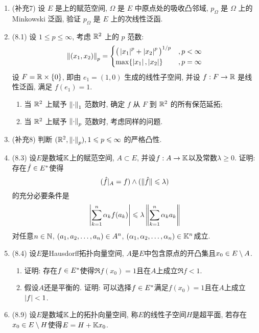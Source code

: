 	\begin{enumerate}[label=\textbf{\arabic*.}, ref=\arabic*]
		\item (补充7) 设 $ E $ 是\R 上的赋范空间, $ \varOmega $ 是 $ E $ 中原点处的吸收凸邻域, $ p_{\varOmega} $ 是 $ \varOmega $ 上的 Minkowski 泛函, 验证 $ p_{\varOmega} $ 是 $ E $ 上的次线性泛函.
		\item (8.1) 设 $ 1\leqslant p\leqslant\infty $, 考虑 $ \mathbb{R}^{2} $ 上的 $ p $ 范数:
			\[
				\left\| (x_{1}, x_{2}) \right\|_{p}=
				\begin{cases}
					\big( \left| x_{1} \right| ^{p}+\left| x_{2} \right| ^{p} \big)^{1/p} & ,p<\infty\\
					\max\{\left| x_{1} \right| , \left| x_{2} \right| \} & ,p = \infty
				\end{cases}
			\]
			设 $ F=\mathbb{R}\times\{ 0 \} $, 即由 $ e_{1}=(1, 0) $ 生成的线性子空间, 并设 $ f:F\to\mathbb{R} $ 是线性泛函, 满足 $ f(e_{1})=1 $.
			\begin{enumerate}[(1)]
				\item 当 $ \mathbb{R}^{2} $ 上赋予 $ \left\| \cdot \right\|_{1} $ 范数时, 确定 $ f $ 从 $ F $ 到 $ \mathbb{R}^{2} $ 的所有保范延拓;
				\item 当 $ \mathbb{R}^{2} $ 上赋予 $ \left\| \cdot \right\|_{p} $ 范数时, 考虑同样的问题.
			\end{enumerate}
		\item (补充8) 判断 $ (\mathbb{R}^{2}, \left\| \cdot \right\|_{p}), 1\leqslant p\leqslant\infty $ 的严格凸性.
		\item (8.3) 设$ E $是数域$ \mathbb{K} $上的赋范空间, $ A\subset E $, 并设$ f : A\to\mathbb{K} $以及常数$ \lambda\geqslant 0 $. 证明: 存在$ \hat{f}\in E^{*} $使得
			\[
			(\hat{f}\rvert_A=f)\land (\lVert \hat{f}\rVert\leqslant\lambda)
			\]
			的充分必要条件是
			\[
			\left| \sum_{k=1}^n\alpha_kf(a_k) \right| \leqslant\lambda\left\| \sum_{k=1}^n\alpha_ka_k \right\|
			\]
			对任意$ n\in\mathbb{N} $, $ (a_{1}, a_{2}, \dots, a_{n})\in A^n $, $ (\alpha_{1}, \alpha_{2}, \dots, \alpha_{n})\in\mathbb{K}^n $成立.
		\item (8.4) 设$ E $是Hausdorff拓扑向量空间, $ A $是$ E $中包含原点的开凸集且$ x_0\in E\setminus A $.
			\begin{enumerate}[(1)]
			\item 证明: 存在$ f\in E^{*} $使得$ \Re f(x_0)=1 $且在$ A $上成立$ \Re f<1 $.
			\item 假设$ A $还是平衡的. 证明: 可以选择$ f\in E^{*} $满足$ f(x_0)=1 $且在$ A $上成立$ \left| f \right| <1 $.
			\end{enumerate}
		\item (8.9) 设$ E $是数域$ \mathbb{K} $上的拓扑向量空间, 称$ E $的线性子空间$ H $是超平面, 若存在$ x_0\in E\setminus H $使得$ E=H+\mathbb{K} x_0 $.
			\begin{enumerate}[(1)]

\end{enumerate}
\end{enumerate}
